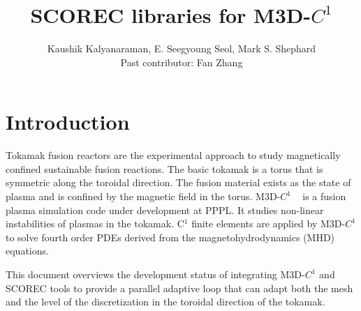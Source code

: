 \documentclass[11pt]{article}  %
\title{SCOREC libraries for M3D-$C^1$}
\author{Kaushik Kalyanaraman, E. Seegyoung Seol, Mark S. Shephard \\
Past contributor: Fan Zhang}
\begin{document}
 
\maketitle
\tableofcontents

\section{Introduction} \label{sec:intro}

Tokamak fusion reactors \cite{wesson2011tokamaks} are the experimental approach to study magnetically confined sustainable fusion reactions. The basic tokamak is a torus that is symmetric along the toroidal direction. The fusion material exists as the state of plasma and is confined by the magnetic field \cite{chen1984introduction} in the torus. M3D-$C^1$ ~\cite{jardin2004triangular,jardin2007high,ferraro2009calculations,jardin2012review,jardin2012multiple, Ferraro2011, Ferraro2014} is a fusion plasma simulation code under development at PPPL.  It studies non-linear instabilities of plasmas in the tokamak.  C$^1$ finite elements are applied by M3D-$C^1$ to solve fourth order PDEs derived from the magnetohydrodynamics (MHD) equations. 

This document overviews the development status of integrating M3D-$C^1$ and SCOREC tools to provide a parallel adaptive loop that can adapt both the mesh and the level of the discretization in the toroidal direction of the tokamak.
\end{document}

